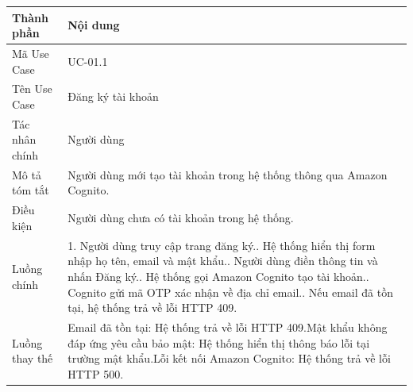 \vspace{0.3cm}
\noindent\begin{tabular}{|p{3.5cm}|p{10.5cm}|}
\hline
\textbf{Thành phần} & \textbf{Nội dung} \\
\hline
Mã Use Case & UC-01.1 \\
\hline
Tên Use Case & Đăng ký tài khoản \\
\hline
Tác nhân chính & Người dùng \\
\hline
Mô tả tóm tắt & Người dùng mới tạo tài khoản trong hệ thống thông qua Amazon Cognito. \\
\hline
Điều kiện & Người dùng chưa có tài khoản trong hệ thống. \\
\hline
Luồng chính & 1. Người dùng truy cập trang đăng ký.\newline 2. Hệ thống hiển thị form nhập họ tên, email và mật khẩu.\newline 3. Người dùng điền thông tin và nhấn Đăng ký.\newline 4. Hệ thống gọi Amazon Cognito tạo tài khoản.\newline 5. Cognito gửi mã OTP xác nhận về địa chỉ email.\newline 6. Nếu email đã tồn tại, hệ thống trả về lỗi HTTP 409. \\
\hline
Luồng thay thế & Email đã tồn tại: Hệ thống trả về lỗi HTTP 409.\newline Mật khẩu không đáp ứng yêu cầu bảo mật: Hệ thống hiển thị thông báo lỗi tại trường mật khẩu.\newline Lỗi kết nối Amazon Cognito: Hệ thống trả về lỗi HTTP 500. \\
\hline
\end{tabular}

